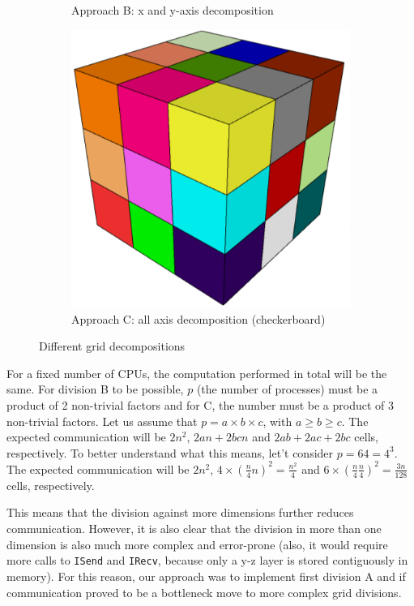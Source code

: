 \documentclass{article}
\begin{document}
\begin{figure}[ht]
\begin{subfigure}[b]{0.2\textwidth}
      \caption{Approach B: x and y-axis decomposition}
      \label{subfig:b}
    \end{subfigure}
    \hfill
    \begin{subfigure}[b]{0.2\textwidth}
      \includegraphics[width=\textwidth]{img/decomp-3.png}
      \caption{Approach C: all axis decomposition (checkerboard)}
      \label{subfig:c}
    \end{subfigure}
    \caption{Different grid decompositions}
    \label{fig:viz-decomp}
\end{figure}

For a fixed number of CPUs, the computation performed in total will be the same.
For division B to be possible, $p$ (the number of processes) must be a product
of 2 non-trivial factors and for C, the number must be a product of 3 non-trivial factors.
Let us assume that $p = a \times b \times c$, with $a \ge b \ge c$. 
The expected communication will be $2n^2$,  $2an + 2bcn$ and
$2ab + 2ac + 2bc$ cells, respectively. To better understand what this means,
let't consider $p=64=4^3$. The expected communication will be $2n^2$,
$4 \times (\frac{n}{4}n)^2 = \frac{n^2}{4}$ and $6 \times (\frac{n}{4}\frac{n}{4})^2 = \frac{3n}{128}$
cells, respectively.

This means that the division against more dimensions further reduces communication.
However, it is also clear that the division in more than one dimension is also
much more complex and error-prone (also, it would require more calls to \texttt{ISend}
and \texttt{IRecv}, because only a y-z layer is stored contiguously in memory).
For this reason, our approach was to implement first division A and if communication
proved to be a bottleneck move to more complex grid divisions.
\end{document}
